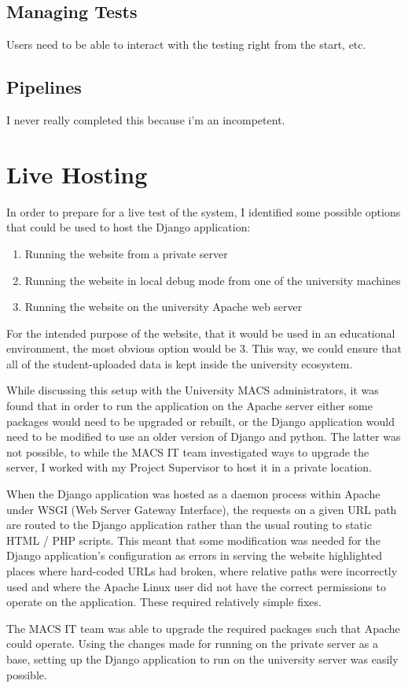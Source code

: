 \documentclass[a4paper,11pt]{report}
\begin{document}
\subsection{Managing Tests}
Users need to be able to interact with the testing right from the start, etc.
\subsection{Pipelines}
I never really completed this because i'm an incompetent.

\section{Live Hosting}
In order to prepare for a live test of the system, I identified some possible options that could be used to host the Django application:
\begin{enumerate}
\item Running the website from a private server
\item Running the website in local debug mode from one of the university machines
\item Running the website on the university Apache web server
\end{enumerate}
For the intended purpose of the website, that it would be used in an educational environment, the most obvious option would be 3. This way, we could ensure that all of the student-uploaded data is kept inside the university ecosystem.\par
While discussing this setup with the University MACS administrators, it was found that in order to run the application on the Apache server either some packages would need to be upgraded or rebuilt, or the Django application would need to be modified to use an older version of Django and python. The latter was not possible, to while the MACS IT team investigated ways to upgrade the server, I worked with my Project Supervisor to host it in a private location.\par
When the Django application was hosted as a daemon process within Apache under WSGI (Web Server Gateway Interface), the requests on a given URL path are routed to the Django application rather than the usual routing to static HTML / PHP scripts. This meant that some modification was needed for the Django application's configuration as errors in serving the website highlighted places where  hard-coded URLs had broken, where relative paths were incorrectly used and where the Apache Linux user did not have the correct permissions to operate on the application. These required relatively simple fixes.\par
The MACS IT team was able to upgrade the required packages such that Apache could operate. Using the changes made for running on the private server as a base, setting up the Django application to run on the university server was easily possible.
\end{document}
